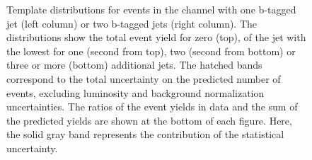 \begin{figure}[htbp!]
\begin{center}
\caption{Template distributions for events in the \ee channel with one b-tagged jet (left column) or two b-tagged jets (right column). The distributions show the total event yield for zero (top), \pt of the jet with the lowest \pt  for one (second from top),
  two (second from bottom) or three or more (bottom) additional jets. 
  The hatched bands correspond to the total uncertainty on the predicted number of events, excluding luminosity and background
        normalization uncertainties.  The ratios of the event yields in data and the sum of the
  predicted yields are shown at the bottom of each figure. Here, the solid
  gray band represents the contribution of the statistical uncertainty.  
       \label{fig:xsec_ee_inputdistr}}
  \end{center}
\end{figure}


